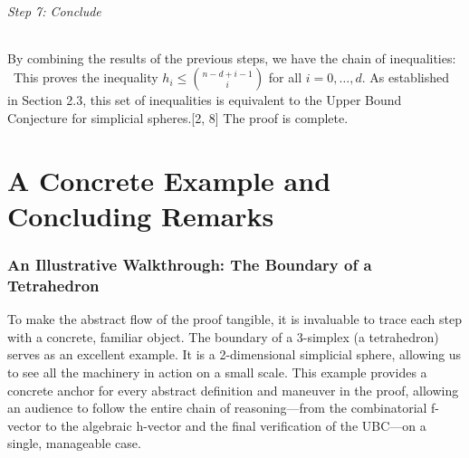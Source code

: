 \documentclass[11pt]{article}
\begin{document}
\paragraph{Step 7: Conclude}
By combining the results of the previous steps, we have the chain of inequalities:
\
This proves the inequality $h_i \le \binom{n-d+i-1}{i}$ for all $i=0, \ldots, d$. As established in Section 2.3, this set of inequalities is equivalent to the Upper Bound Conjecture for simplicial spheres.[2, 8] The proof is complete.

\part{A Concrete Example and Concluding Remarks}

\section{An Illustrative Walkthrough: The Boundary of a Tetrahedron}

To make the abstract flow of the proof tangible, it is invaluable to trace each step with a concrete, familiar object. The boundary of a 3-simplex (a tetrahedron) serves as an excellent example. It is a 2-dimensional simplicial sphere, allowing us to see all the machinery in action on a small scale. This example provides a concrete anchor for every abstract definition and maneuver in the proof, allowing an audience to follow the entire chain of reasoning—from the combinatorial f-vector to the algebraic h-vector and the final verification of the UBC—on a single, manageable case.
\end{document}
